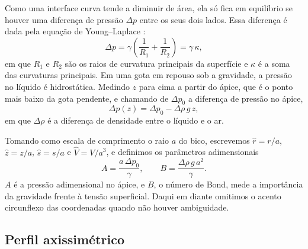 \documentclass[12pt, oneside, a4paper, english, brazil]{abntex2}
\theoremstyle{relatorio}
\theoremstyle{relatorioit}
\theoremstyle{problema}
\newcommand{\Vh}{\hat V}
\begin{document}
Como uma interface curva tende a diminuir de área, ela só fica em equilíbrio se houver
uma diferença de pressão $\Delta p$ entre os seus dois lados. Essa diferença é dada pela
equação de Young--Laplace \parencite{degennes2004}:
\begin{equation}
  \Delta p = \gamma \left( \frac{1}{R_1} + \frac{1}{R_2} \right) = \gamma\,\kappa,
  \label{eq:young-laplace}
\end{equation}
em que $R_1$ e $R_2$ são os raios de curvatura principais da superfície e $\kappa$ é a
soma das curvaturas principais. Em uma gota em repouso sob a gravidade, a pressão no
líquido é hidrostática. Medindo $z$ para cima a partir do ápice, que é o ponto mais
baixo da gota pendente, e chamando de $\Delta p_0$ a diferença de pressão no ápice,
\begin{equation}
  \Delta p(z) = \Delta p_0 - \Delta\rho\, g\, z,
  \label{eq:hidrostatica}
\end{equation}
em que $\Delta\rho$ é a diferença de densidade entre o líquido e o ar.

Tomando como escala de comprimento o raio $a$ do bico, escrevemos $\hat r = r/a$,
$\hat z = z/a$, $\hat s = s/a$ e $\Vh = V/a^3$, e definimos os parâmetros adimensionais
\begin{equation}
  A = \frac{a\, \Delta p_0}{\gamma}, \qquad B = \frac{\Delta\rho\, g\, a^2}{\gamma}.
  \label{eq:adimensionais}
\end{equation}
$A$ é a pressão adimensional no ápice, e $B$, o número de Bond, mede a importância da
gravidade frente à tensão superficial. Daqui em diante omitimos o acento circunflexo
das coordenadas quando não houver ambiguidade.

\subsection{Perfil axissimétrico}
\end{document}
